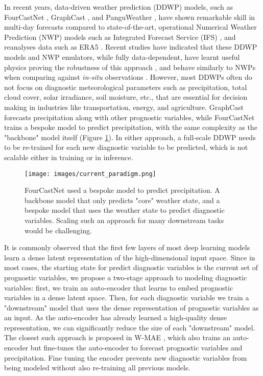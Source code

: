 \documentclass{article}
\begin{document}
In recent years, data-driven weather prediction (DDWP) models, such as FourCastNet \cite{pathak2022fourcastnet}, GraphCast \cite{lam2022graphcast}, and PanguWeather \cite{bi2023accurate}, have shown remarkable skill in multi-day forecasts compared to state-of-the-art, operational Numerical Weather Prediction (NWP) models such as Integrated Forecast Service (IFS) \cite{rasp2023weatherbench}, and reanalyses data such as ERA5 \cite{nguyen2023climax}. Recent studies have indicated that these DDWP models and NWP emulators, while fully data-dependent, have learnt useful physics proving the robustness of this approach \cite{hakim2023dynamical}, and behave similarly to NWPs when comparing against \textit{in-situ} observations \cite{ramavajjala2023verification}. However, most DDWPs often do not focus on diagnostic meteorological parameters such as precipitation, total cloud cover, solar irradiance, soil moisture, etc., that are essential for decision making in industries like transportation, energy, and agriculture. GraphCast\cite{lam2022graphcast} forecasts precipitation along with other prognostic variables, while FourCastNet\cite{pathak2022fourcastnet} trains a bespoke model to predict precipitation, with the same complexity as the "backbone" model itself (Figure \ref{fig:bespoke}). In either approach, a full-scale DDWP needs to be re-trained for each new diagnostic variable to be predicted, which is not scalable either in training or in inference.

\begin{figure}
    \centering
    \texttt{[image: images/current\_paradigm.png]}
    \caption{FourCastNet used a bespoke model to predict precipitation. A backbone model that only predicts "core" weather state, and a bespoke model that uses the weather state to predict diagnostic variables. Scaling such an approach for many downstream tasks would be challenging.}
    \label{fig:bespoke}
\end{figure}

It is commonly observed that the first few layers of most deep learning models learn a dense latent representation of the high-dimensional input space\cite{li2023transformers, zeiler2014visualizing, zhou2022understanding}. Since in most cases, the starting state for predict diagnostic variables is the current set of prognostic variables, we propose a two-stage approach to modeling diagnostic variables: first, we train an auto-encoder that learns to embed prognostic variables in a dense latent space. Then, for each diagnostic variable we train a "downstream" model that uses the dense representation of prognostic variables as an input. As the auto-encoder has already learned a high-quality dense representation, we can significantly reduce the size of each "downstream" model. The closest such approach is proposed in W-MAE \cite{man2023w}, which also trains an auto-encoder but fine-tunes the auto-encoder to forecast prognostic variables and precipitation. Fine tuning the encoder prevents new diagnostic variables from being modeled without also re-training all previous models.
\end{document}
